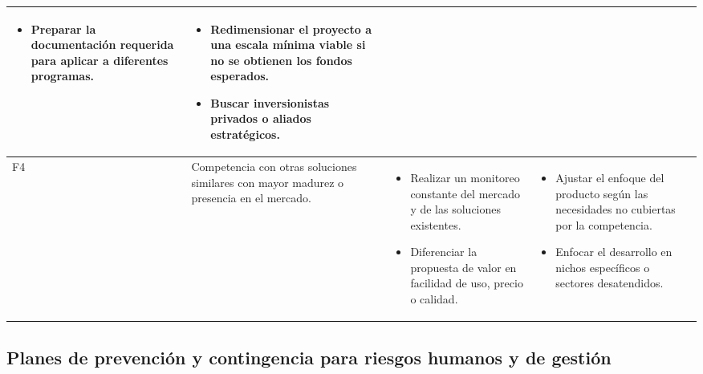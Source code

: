 \begin{longtable}{|>{\centering\arraybackslash}p{0.7cm}|>{\raggedright\arraybackslash}p{4cm}|>{\raggedright\arraybackslash}p{5.5cm}|>{\raggedright\arraybackslash}p{5.5cm}|}
\begin{itemize}
		\item Preparar la documentación requerida para aplicar a diferentes programas.
	\end{itemize} &
	\begin{itemize}
		\item Redimensionar el proyecto a una escala mínima viable si no se obtienen los fondos esperados.
		\item Buscar inversionistas privados o aliados estratégicos.
	\end{itemize} \\
	\hline
	F4 & Competencia con otras soluciones similares con mayor madurez o presencia en el mercado. &
	\begin{itemize}
		\item Realizar un monitoreo constante del mercado y de las soluciones existentes.
		\item Diferenciar la propuesta de valor en facilidad de uso, precio o calidad.
	\end{itemize} &
	\begin{itemize}
		\item Ajustar el enfoque del producto según las necesidades no cubiertas por la competencia.
		\item Enfocar el desarrollo en nichos específicos o sectores desatendidos.
	\end{itemize} \\
	\hline
\end{longtable}


\subsection{Planes de prevención y contingencia para riesgos humanos y de gestión}

